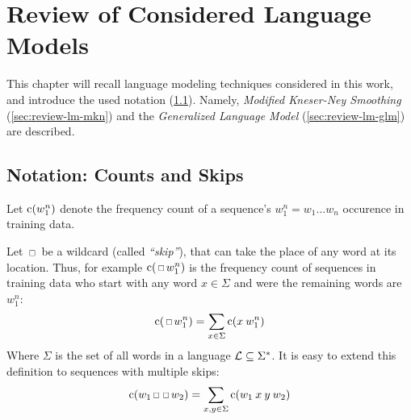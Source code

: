 \chapter{Review of Considered Language Models}
\label{ch:review-lm}

This chapter will recall language modeling techniques considered in this work,
and introduce the used notation (\cref{sec:review-notation}).
Namely, \emph{Modified Kneser-Ney Smoothing} (\cref{sec:review-lm-mkn})
and the \emph{Generalized Language Model} (\cref{sec:review-lm-glm})
are described.


\section{Notation: Counts and Skips}
\label{sec:review-notation}

Let $\operatorname{c}(w_1^n)$ denote the frequency count of a sequence's
$w_1^n = w_1 \ldots w_n$ occurence in training data.

Let $\Skp$ be a wildcard (called \emph{``skip''}), that can take the place
of any word at its location.
Thus, for example $\Count(\Skp w_1^n)$ is the frequency count of sequences
in training data who start with any word $x \in \Sigma$ and were the remaining
words are $w_1^n$:
\begin{equation}
  \Count(\Skp w_1^n) = \sum_{x \in \Sigma} \Count(x \: w_1^n)
\end{equation}
Where $\Sigma$ is the set of all words in a language
$\mathcal{L} \subseteq \Sigma^{*}$.
It is easy to extend this definition to sequences with multiple skips:
\begin{equation}
  \Count(w_1 \Skp \Skp w_2) = \sum_{x, y \in \Sigma} \Count(w_1 \: x \: y \: w_2)
\end{equation}


